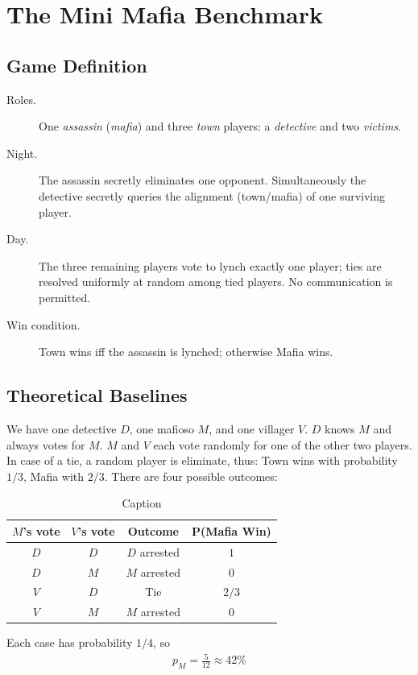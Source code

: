 \documentclass{article}
\begin{document}
\section{The Mini Mafia Benchmark}



\subsection{Game Definition}

\begin{description}
  \item[Roles.] One \emph{assassin} (\emph{mafia}) and three \emph{town} players: a \emph{detective} and two \emph{victims}.
  \item[Night.] The assassin secretly eliminates one opponent.  Simultaneously the detective secretly queries the alignment (town/mafia) of one surviving player.
  \item[Day.] The three remaining players vote to lynch exactly one player; ties are resolved uniformly at random among tied players.  No communication is permitted.
  \item[Win condition.]  Town wins iff the assassin is lynched; otherwise Mafia wins.
\end{description}


\subsection{Theoretical Baselines}


We have one detective $D$, one mafioso $M$, and one villager $V$.  
$D$ knows $M$ and always votes for $M$.  
$M$ and $V$ each vote randomly for one of the other two players.  
In case of a tie, a random player is eliminate, thus: Town wins with probability $1/3$, Mafia with $2/3$. There are four possible outcomes:
\begin{table}[ht]
    \centering
    \begin{tabular}{|c|c|c|c|}
        \hline
        $M$'s vote & $V$'s vote & Outcome & P(Mafia Win) \\
        \hline
        $D$ & $D$ & $D$ arrested & $1$ \\
        $D$ & $M$ & $M$ arrested & $0$ \\
        $V$ & $D$ & Tie & $2/3$ \\
        $V$ & $M$ & $M$ arrested & $0$ \\
        \hline
    \end{tabular}
    \caption{Caption}
    \label{tab:placeholder}
\end{table}
Each case has probability $1/4$, so
\begin{align}
    p_M=\frac{5}{12}\approx42\%
\end{align}
\end{document}
